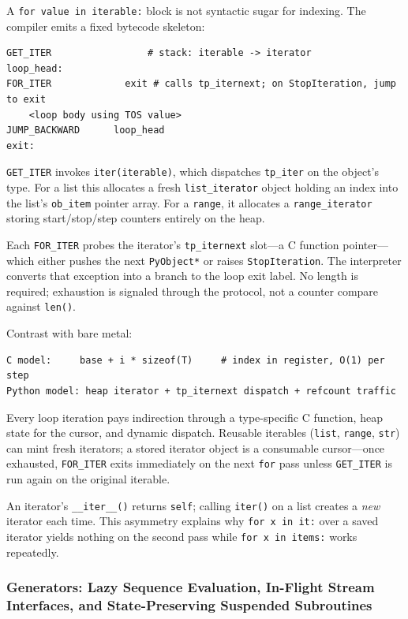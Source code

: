 \documentclass[a4paper,twoside]{report}
\begin{document}
A \texttt{for value in iterable:} block is not syntactic sugar for indexing. The compiler emits a fixed bytecode skeleton:

\begin{verbatim}
GET_ITER                 # stack: iterable -> iterator
loop_head:
FOR_ITER             exit # calls tp_iternext; on StopIteration, jump to exit
    <loop body using TOS value>
JUMP_BACKWARD      loop_head
exit:
\end{verbatim}

\texttt{GET\_ITER} invokes \texttt{iter(iterable)}, which dispatches \texttt{tp\_iter} on the object's type. For a list this allocates a fresh \texttt{list\_iterator} object holding an index into the list's \texttt{ob\_item} pointer array. For a \texttt{range}, it allocates a \texttt{range\_iterator} storing start/stop/step counters entirely on the heap.

Each \texttt{FOR\_ITER} probes the iterator's \texttt{tp\_iternext} slot---a C function pointer---which either pushes the next \texttt{PyObject*} or raises \texttt{StopIteration}. The interpreter converts that exception into a branch to the loop exit label. No length is required; exhaustion is signaled through the protocol, not a counter compare against \texttt{len()}.

Contrast with bare metal:

\begin{verbatim}
C model:     base + i * sizeof(T)     # index in register, O(1) per step
Python model: heap iterator + tp_iternext dispatch + refcount traffic
\end{verbatim}

Every loop iteration pays indirection through a type-specific C function, heap state for the cursor, and dynamic dispatch. Reusable iterables (\texttt{list}, \texttt{range}, \texttt{str}) can mint fresh iterators; a stored iterator object is a consumable cursor---once exhausted, \texttt{FOR\_ITER} exits immediately on the next \texttt{for} pass unless \texttt{GET\_ITER} is run again on the original iterable.

An iterator's \texttt{\_\_iter\_\_()} returns \texttt{self}; calling \texttt{iter()} on a list creates a \emph{new} iterator each time. This asymmetry explains why \texttt{for x in it:} over a saved iterator yields nothing on the second pass while \texttt{for x in items:} works repeatedly.

\subsubsection{Generators: Lazy Sequence Evaluation, In-Flight Stream Interfaces, and State-Preserving Suspended Subroutines}
\end{document}
